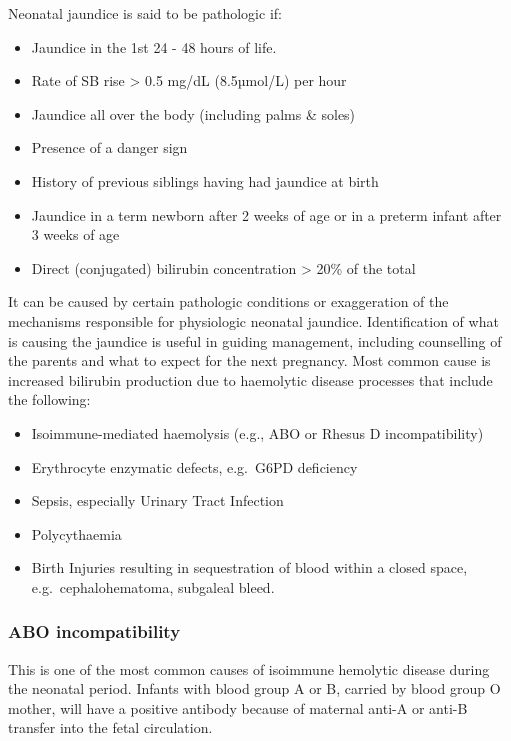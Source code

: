 \documentclass[
  letterpaper,
  DIV=11,
  numbers=noendperiod]{scrreprt}
\providecommand{\tightlist}{%
  \setlength{\itemsep}{0pt}\setlength{\parskip}{0pt}}\usepackage{longtable,booktabs,array}
\begin{document}
Neonatal jaundice is said to be pathologic if:

\begin{itemize}
\tightlist
\item
  Jaundice in the 1st 24 - 48 hours of life.
\item
  Rate of SB rise \textgreater{} 0.5 mg/dL (8.5µmol/L) per hour
\item
  Jaundice all over the body (including palms \& soles)
\item
  Presence of a danger sign
\item
  History of previous siblings having had jaundice at birth
\item
  Jaundice in a term newborn after 2 weeks of age or in a preterm infant
  after 3 weeks of age
\item
  Direct (conjugated) bilirubin concentration \textgreater{} 20\% of the
  total
\end{itemize}

It can be caused by certain pathologic conditions or exaggeration of the
mechanisms responsible for physiologic neonatal jaundice. Identification
of what is causing the jaundice is useful in guiding management,
including counselling of the parents and what to expect for the next
pregnancy. Most common cause is increased bilirubin production due to
haemolytic disease processes that include the following:

\begin{itemize}
\tightlist
\item
  Isoimmune-mediated haemolysis (e.g., ABO or Rhesus D incompatibility)
\item
  Erythrocyte enzymatic defects, e.g.~G6PD deficiency
\item
  Sepsis, especially Urinary Tract Infection
\item
  Polycythaemia
\item
  Birth Injuries resulting in sequestration of blood within a closed
  space, e.g.~cephalohematoma, subgaleal bleed.
\end{itemize}

\hypertarget{abo-incompatibility}{%
\subsubsection{ABO incompatibility}\label{abo-incompatibility}}

This is one of the most common causes of isoimmune hemolytic disease
during the neonatal period. Infants with blood group A or B, carried by
blood group O mother, will have a positive antibody because of maternal
anti-A or anti-B transfer into the fetal circulation.
\end{document}
